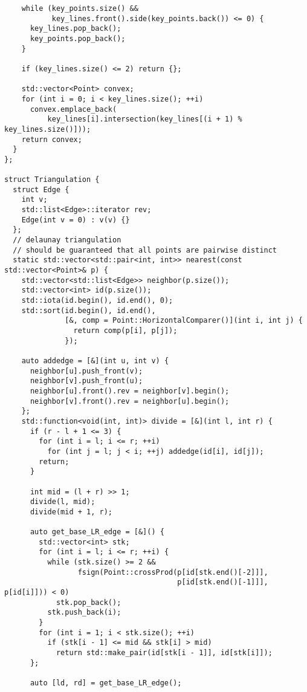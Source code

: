 \documentclass[6pt]{article}
\begin{document}
\begin{multicols}{2}
\begin{lstlisting}
    while (key_points.size() &&
           key_lines.front().side(key_points.back()) <= 0) {
      key_lines.pop_back();
      key_points.pop_back();
    }

    if (key_lines.size() <= 2) return {};

    std::vector<Point> convex;
    for (int i = 0; i < key_lines.size(); ++i)
      convex.emplace_back(
          key_lines[i].intersection(key_lines[(i + 1) % key_lines.size()]));
    return convex;
  }
};

struct Triangulation {
  struct Edge {
    int v;
    std::list<Edge>::iterator rev;
    Edge(int v = 0) : v(v) {}
  };
  // delaunay triangulation
  // should be guaranteed that all points are pairwise distinct
  static std::vector<std::pair<int, int>> nearest(const std::vector<Point>& p) {
    std::vector<std::list<Edge>> neighbor(p.size());
    std::vector<int> id(p.size());
    std::iota(id.begin(), id.end(), 0);
    std::sort(id.begin(), id.end(),
              [&, comp = Point::HorizontalComparer()](int i, int j) {
                return comp(p[i], p[j]);
              });

    auto addedge = [&](int u, int v) {
      neighbor[u].push_front(v);
      neighbor[v].push_front(u);
      neighbor[u].front().rev = neighbor[v].begin();
      neighbor[v].front().rev = neighbor[u].begin();
    };
    std::function<void(int, int)> divide = [&](int l, int r) {
      if (r - l + 1 <= 3) {
        for (int i = l; i <= r; ++i)
          for (int j = l; j < i; ++j) addedge(id[i], id[j]);
        return;
      }

      int mid = (l + r) >> 1;
      divide(l, mid);
      divide(mid + 1, r);

      auto get_base_LR_edge = [&]() {
        std::vector<int> stk;
        for (int i = l; i <= r; ++i) {
          while (stk.size() >= 2 &&
                 fsign(Point::crossProd(p[id[stk.end()[-2]]],
                                        p[id[stk.end()[-1]]], p[id[i]])) < 0)
            stk.pop_back();
          stk.push_back(i);
        }
        for (int i = 1; i < stk.size(); ++i)
          if (stk[i - 1] <= mid && stk[i] > mid)
            return std::make_pair(id[stk[i - 1]], id[stk[i]]);
      };

      auto [ld, rd] = get_base_LR_edge();


\end{lstlisting}
\end{multicols}
\end{document}
